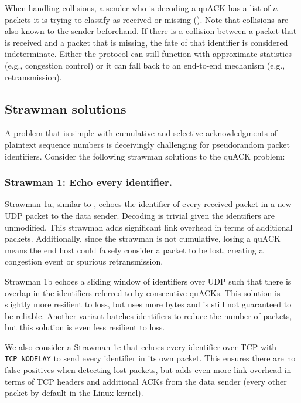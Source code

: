 

When handling collisions, a sender who is decoding a quACK has a list of $n$
packets it is trying to classify as received or missing
(). Note that collisions are also known to the
sender beforehand. If there is a collision between a packet that is received
and a packet that is missing, the fate of that identifier is considered
indeterminate. Either the protocol can still function with approximate
statistics (e.g., congestion control) or it can fall back to an end-to-end
mechanism (e.g., retransmission).

\subsection{Strawman solutions}
\label{sec:quack:problem:strawmen}

A problem that is simple with cumulative and selective acknowledgments of
plaintext sequence numbers is deceivingly challenging for pseudorandom
packet identifiers. Consider the following strawman solutions to the quACK
problem:

\subsubsection{Strawman 1: Echo every identifier.}
Strawman 1a, similar to \cite{li-tsvwg-loops-problem-opportunities-06,kramer2020lwpep},
echoes the identifier of every received packet in a new UDP packet to the data
sender.  Decoding is trivial given the identifiers are unmodified.
This strawman adds significant link overhead in terms of additional packets.
Additionally, since the strawman is not cumulative, losing a quACK means the
end host could falsely consider a packet to be lost, creating a congestion
event or spurious retransmission.

Strawman 1b echoes a sliding window of identifiers over UDP such that there is overlap
in the identifiers referred to by consecutive quACKs.
This solution is slightly more resilient to loss, but uses more bytes and is
still not guaranteed to be reliable.
Another variant batches identifiers to reduce the number of packets, but this
solution is even less resilient to loss.

We also consider a Strawman 1c that echoes every identifier over TCP with
\texttt{TCP\_NODELAY} to send every identifier in its own packet.
This ensures there are no false positives when detecting lost packets,
but adds even more link overhead in terms of TCP headers and additional ACKs
from the data sender (every other packet by default in the Linux kernel).

